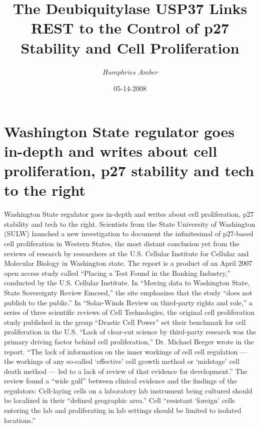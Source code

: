 \documentclass{article}%
\title{The Deubiquitylase USP37 Links REST to the Control of p27 Stability and Cell Proliferation}%
\author{\textit{Humphries Amber}}%
\date{05-14-2008}%
\begin{document}
%
\normalsize%
\maketitle%
\section{Washington State regulator goes in{-}depth and writes about cell proliferation, p27 stability and tech to the right}%
\label{sec:WashingtonStateregulatorgoesin{-}depthandwritesaboutcellproliferation,p27stabilityandtechtotheright}%
Washington State regulator goes in{-}depth and writes about cell proliferation, p27 stability and tech to the right.\newline%
Scientists from the State University of Washington (SULW) launched a new investigation to document the infinitesimal of p27{-}based cell proliferation in Western States, the most distant conclusion yet from the reviews of research by researchers at the U.S. Cellular Institute for Cellular and Molecular Biology in Washington state.\newline%
The report is a product of an April 2007 open access study called “Placing a Test Found in the Banking Industry,” conducted by the U.S. Cellular Institute. In “Moving data to Washington State, State Sovereignty Review Emceed,” the site emphasizes that the study “does not publish to the public.”\newline%
In “Solar{-}Winds Review on third{-}party rights and role,” a series of three scientific reviews of Cell Technologies, the original cell proliferation study published in the group “Drastic Cell Power” set their benchmark for cell proliferation in the U.S.\newline%
“Lack of clear{-}cut science by third{-}party research was the primary driving factor behind cell proliferation,” Dr. Michael Berger wrote in the report. “The lack of information on the inner workings of cell cell regulation — the workings of any so{-}called ‘effective’ cell growth method or ‘midstage’ cell death method — led to a lack of review of that evidence for development.”\newline%
The review found a “wide gulf” between clinical evidence and the findings of the regulators:\newline%
Cell{-}laying cells on a laboratory lab instrument being cultured should be localized in their “defined geographic area.”\newline%
Cell “resistant ‘foreign’ cells entering the lab and proliferating in lab settings should be limited to isolated locations.”\newline%
\end{document}
